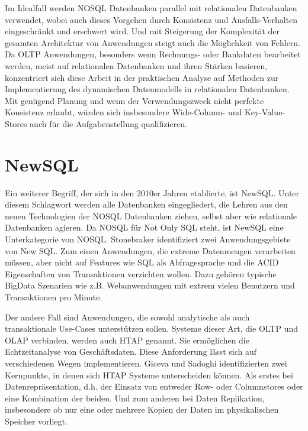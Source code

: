 Im Idealfall werden NOSQL Datenbanken parallel mit relationalen Datenbanken verwendet, wobei auch dieses Vorgehen durch Konsistenz und Ausfalls-Verhalten eingeschränkt und erschwert wird. Und mit Steigerung der Komplexität der gesamten Architektur von Anwendungen steigt auch die Möglichkeit von Fehlern. Da \ac{OLTP} Anwendungen, besonders wenn Rechnungs- oder Bankdaten bearbeitet werden, meist auf relationalen Datenbanken und ihren Stärken basieren, konzentriert sich diese Arbeit in der praktischen Analyse auf Methoden zur Implementierung des dynamischen Datenmodells in relationalen Datenbanken. Mit genügend Planung und wenn der Verwendungszweck nicht perfekte Konsistenz erlaubt, würden sich insbesondere Wide-Column- und Key-Value-Stores auch für die Aufgabenstellung qualifizieren.

%  







\section{NewSQL}

Ein weiterer Begriff, der sich in den 2010er Jahren etablierte, ist NewSQL. Unter diesem Schlagwort werden alle Datenbanken eingegliedert, die Lehren aus den neuen Technologien der NOSQL Datenbanken ziehen, selbst aber wie relationale Datenbanken agieren. Da NOSQL für Not Only SQL steht, ist NewSQL eine Unterkategorie von NOSQL. 
Stonebraker \cite{MichaelStonebraker.2011} identifiziert zwei Anwendungsgebiete von New SQL. Zum einen Anwendungen, die extreme Datenmengen verarbeiten müssen, aber nicht auf Features wie SQL als Abfragesprache und die ACID Eigenschaften von Transaktionen verzichten wollen. Dazu gehören typische BigData Szenarien wie z.B. Webanwendungen mit extrem vielen Benutzern und Transaktionen pro Minute.
 
Der andere Fall sind Anwendungen, die sowohl analytische als auch transaktionale Use-Cases unterstützen sollen. Systeme dieser Art, die \ac{OLTP} und \ac{OLAP} verbinden, werden auch \ac{HTAP} genannt. Sie ermöglichen die Echtzeitanalyse von Geschäftsdaten. Diese Anforderung lässt sich auf verschiedenen Wegen implementieren. Giceva und Sadoghi \cite{Giceva.2018} identifizierten zwei Kernpunkte, in denen sich HTAP Systeme unterscheiden können. Als erstes bei Datenrepräsentation, d.h. der Einsatz von entweder Row- oder Columnstores oder eine Kombination der beiden. Und zum anderen bei Daten Replikation, insbesondere ob nur eine oder mehrere Kopien der Daten im physikalischen Speicher vorliegt.

